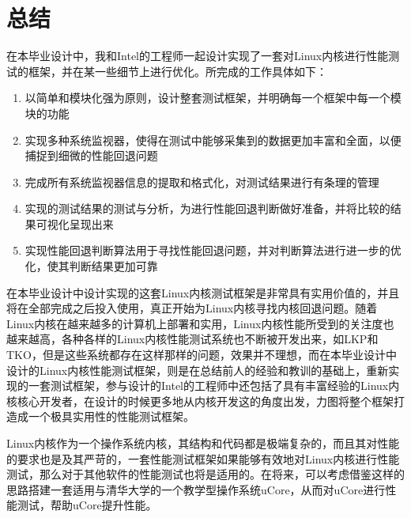 

\chapter{总结}
在本毕业设计中，我和Intel的工程师一起设计实现了一套对Linux内核进行性能测试的框架，并在某一些细节上进行优化。所完成的工作具体如下：
\begin{enumerate}
\item 以简单和模块化强为原则，设计整套测试框架，并明确每一个框架中每一个模块的功能
\item 实现多种系统监视器，使得在测试中能够采集到的数据更加丰富和全面，以便捕捉到细微的性能回退问题
\item 完成所有系统监视器信息的提取和格式化，对测试结果进行有条理的管理
\item 实现的测试结果的测试与分析，为进行性能回退判断做好准备，并将比较的结果可视化呈现出来
\item 实现性能回退判断算法用于寻找性能回退问题，并对判断算法进行进一步的优化，使其判断结果更加可靠
\end{enumerate}

在本毕业设计中设计实现的这套Linux内核测试框架是非常具有实用价值的，并且将在全部完成之后投入使用，真正开始为Linux内核寻找内核回退问题。随着Linux内核在越来越多的计算机上部署和实用，Linux内核性能所受到的关注度也越来越高，各种各样的Linux内核性能测试系统也不断被开发出来，如LKP\cite{chen2007keeping}和TKO\cite{bligh2006fully}，但是这些系统都存在这样那样的问题，效果并不理想，而在本毕业设计中设计的Linux内核性能测试框架，则是在总结前人的经验和教训的基础上，重新实现的一套测试框架，参与设计的Intel的工程师中还包括了具有丰富经验的Linux内核核心开发者，在设计的时候更多地从内核开发这的角度出发，力图将整个框架打造成一个极具实用性的性能测试框架。


Linux内核作为一个操作系统内核，其结构和代码都是极端复杂的，而且其对性能的要求也是及其严苛的，一套性能测试框架如果能够有效地对Linux内核进行性能测试，那么对于其他软件的性能测试也将是适用的。在将来，可以考虑借鉴这样的思路搭建一套适用与清华大学的一个教学型操作系统uCore，从而对uCore进行性能测试，帮助uCore提升性能。